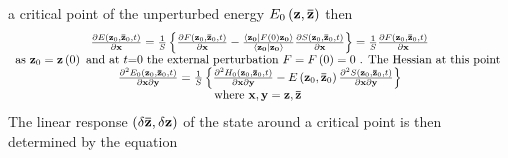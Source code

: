 \documentclass{amsart}
\begin{document}
a critical point of the unperturbed energy $E_0 \left( {{\rm {\bf z}},{\rm
{\bf \bar {z}}}} \right)$ then
\[
\begin{array}{c}
 \frac{\partial E\left( {{\rm {\bf z}}_0 ,{\rm {\bf \bar {z}}}_0 ,t}
\right)}{\partial {\rm {\bf x}}}=\frac{1}{S}\left\{ {\frac{\partial F\left(
{{\rm {\bf z}}_0 ,{\rm {\bf \bar {z}}}_0 ,t} \right)}{\partial {\rm {\bf
x}}}-\frac{\left\langle {{\rm {\bf z}}_{\rm {\bf 0}} } \mathrel{\left|
{\vphantom {{{\rm {\bf z}}_{\rm {\bf 0}} } {F\left( 0 \right){\rm {\bf
z}}_{\rm {\bf 0}} }}} \right. \kern-\nulldelimiterspace} {F\left( 0
\right){\rm {\bf z}}_{\rm {\bf 0}} } \right\rangle }{\left\langle {{\rm {\bf
z}}_{\rm {\bf 0}} } \mathrel{\left| {\vphantom {{{\rm {\bf z}}_{\rm {\bf 0}}
} {{\rm {\bf z}}_{\rm {\bf 0}} }}} \right. \kern-\nulldelimiterspace} {{\rm
{\bf z}}_{\rm {\bf 0}} } \right\rangle }\frac{\partial S\left( {{\rm {\bf
z}}_0 ,{\rm {\bf \bar {z}}}_0 ,t} \right)}{\partial {\rm {\bf x}}}}
\right\}=\frac{1}{S}\frac{\partial F\left( {{\rm {\bf z}}_0 ,{\rm {\bf \bar
{z}}}_0 ,t} \right)}{\partial {\rm {\bf x}}} \\
 \mbox{as }{\rm {\bf z}}_0 ={\rm {\bf z}}\left( 0 \right)\mbox{ and at
}t\mbox{=}0\mbox{ the external perturbation }F=F\left( 0 \right)=0\mbox{ .
The Hessian at this point } \\
 \frac{\partial ^2E_0 \left( {{\rm {\bf z}}_0 ,{\rm {\bf \bar {z}}}_0 ,t}
\right)}{\partial {\rm {\bf x}}\partial {\rm {\bf y}}}=\frac{1}{S}\left\{
{\frac{\partial ^2H_0 \left( {{\rm {\bf z}}_0 ,{\rm {\bf \bar {z}}}_0 ,t}
\right)}{\partial {\rm {\bf x}}\partial {\rm {\bf y}}}-E\left( {{\rm {\bf
z}}_0 ,{\rm {\bf \bar {z}}}_0 } \right)\frac{\partial ^2S\left( {{\rm {\bf
z}}_0 ,{\rm {\bf \bar {z}}}_0 ,t} \right)}{\partial {\rm {\bf x}}\partial
{\rm {\bf y}}}} \right\} \\
 \mbox{where }{\rm {\bf x}},{\rm {\bf y}}={\rm {\bf z}},{\rm {\bf \bar
{z}}}\mbox{ } \\
 \end{array}
\]
The linear response $\left( {\delta {\rm {\bf \bar {z}}},\delta {\rm {\bf
z}}} \right)$  of the state around a critical point is then determined by the
equation
\end{document}

